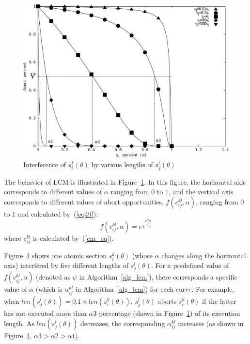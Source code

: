\documentclass{sig-alternate}
\begin{document}
%
\begin{figure}[htbp]
\centering
\includegraphics[scale=0.4]{figures/figure16}
\caption{\label{fig16}Interference of $s_{i}^{k}(\theta)$ by various lengths of 
$s_{j}^{l}(\theta)$}
\end{figure}

The behavior of LCM is illustrated in Figure~\ref{fig16}. In this figure, the horizontal axis corresponds to different values of $\alpha$ ranging from $0$ to $1$, and the vertical axis corresponds to different values of abort opportunities, $f(c_{ij}^{kl},\alpha)$, ranging from $0$ to $1$ and calculated by~(\ref{eq49}):
\begin{equation}
f(c_{ij}^{kl},\alpha)=e^{\frac{-c_{ij}^{kl}\alpha}{1-\alpha}}
\label{eq49}\end{equation}
where $c_{ij}^{kl}$ is calculated by~(\ref{cm_eq}).

Figure~\ref{fig16} shows one atomic section $s_i^k(\theta)$ (whose $\alpha$ changes along the horizontal axis) interfered by five different lengths of $s_j^l(\theta)$.
For a predefined value of $f(c_{ij}^{kl},\alpha)$ (denoted as $\psi$ in Algorithm~\ref{alg_lcm}), there corresponds a specific value of $\alpha$ (which is $\alpha_{ij}^{kl}$ in Algorithm~\ref{alg_lcm}) for each curve. For example, when $len(s_j^l(\theta))=0.1 \times len(s_i^k(\theta))$, $s_j^l(\theta)$ aborts $s_i^k(\theta)$ if the latter has not executed more than $\alpha3$ percentage (shown in Figure~\ref{fig16}) of its execution length. As $len(s_{j}^{l}(\theta))$ decreases, the corresponding $\alpha_{ij}^{kl}$ increases (as shown in Figure~\ref{fig16}, $\alpha3>\alpha2>\alpha1$).
\end{document}
